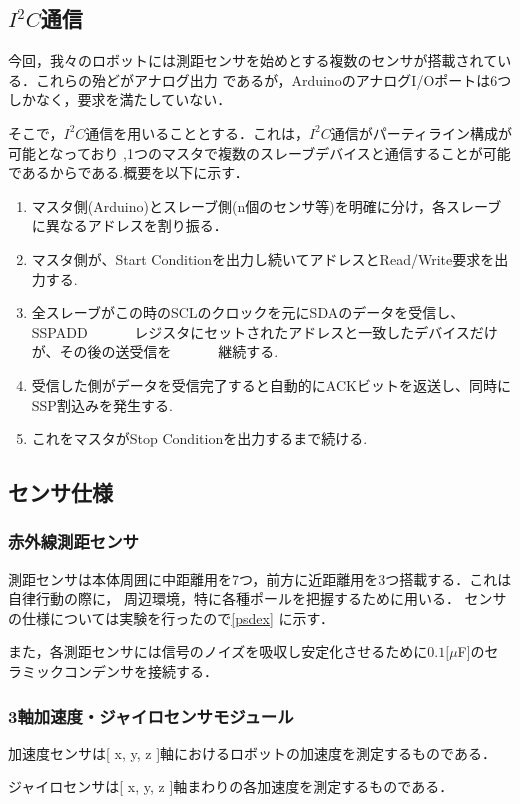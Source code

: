 \subsection{$I^2 C$通信}
今回，我々のロボットには測距センサを始めとする複数のセンサが搭載されている．これらの殆どがアナログ出力
であるが，ArduinoのアナログI/Oポートは6つしかなく，要求を満たしていない．

そこで，$I^2 C$通信を用いることとする．これは，$I^2 C$通信がパーティライン構成が可能となっており
,1つのマスタで複数のスレーブデバイスと通信することが可能であるからである.概要を以下に示す．
\begin{enumerate}
 \item マスタ側(Arduino)とスレーブ側(n個のセンサ等)を明確に分け，各スレーブに異なるアドレスを割り振る．
 \item マスタ側が、Start Conditionを出力し続いてアドレスとRead/Write要求を出力する.
 \item 全スレーブがこの時のSCLのクロックを元にSDAのデータを受信し、SSPADD
　　　レジスタにセットされたアドレスと一致したデバイスだけが、その後の送受信を
　　　継続する.
 \item 受信した側がデータを受信完了すると自動的にACKビットを返送し、同時にSSP割込みを発生する.
 \item これをマスタがStop Conditionを出力するまで続ける.
\end{enumerate}

\subsection{センサ仕様}
\subsubsection{赤外線測距センサ}  
測距センサは本体周囲に中距離用を7つ，前方に近距離用を3つ搭載する．これは自律行動の際に，
周辺環境，特に各種ポールを把握するために用いる． センサの仕様については実験を行ったので\ref{psdex}
 に示す．

また，各測距センサには信号のノイズを吸収し安定化させるために$0.1[\mu $F]のセラミックコンデンサを接続する．

\subsubsection{3軸加速度・ジャイロセンサモジュール}
加速度センサは[ x, y, z ]軸におけるロボットの加速度を測定するものである．

ジャイロセンサは[ x, y, z ]軸まわりの各加速度を測定するものである．

